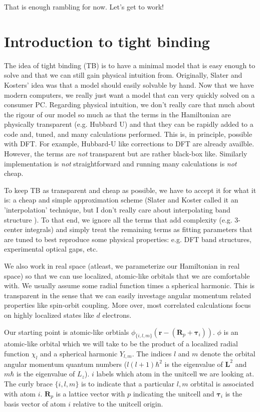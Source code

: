\documentclass[prb,aps,11pt,superscriptaddress,floatfix]{revtex4-2}
\begin{document}
That is enough rambling for now. Let's get to work!


\section{Introduction to tight binding}

The idea of tight binding (TB) is to have a minimal model that is easy enough to solve and that we can still gain physical intuition from. Originally, Slater and Kosters' idea was that a model should easily solvable by hand. Now that we have modern computers, we really just want a model that can very quickly solved on a consumer PC. Regarding physical intuition, we don't really care that much about the rigour of our model so much as that the terms in the Hamiltonian are physically transparent (e.g. Hubbard U) and that they can be rapidly added to a code and, tuned, and many calculations performed. This is, in principle, possible with DFT. For example, Hubbard-U like corrections to DFT are already availble. However, the terms are \emph{not} transparent but are rather black-box like. Similarly implementation is \emph{not} straightforward and running many calculations is \emph{not} cheap. 

To keep TB as transparent and cheap as possible, we have to accept it for what it is: a cheap and simple approximation scheme (Slater and Koster called it an 'interpolation' technique, but I don't really care about interpolating band structure ). To that end, we ignore all the terms that add complexity (e.g. 3-center integrals) and simply treat the remaining terms as fitting parameters that are tuned to best reproduce some physical properties: e.g. DFT band structures, experimental optical gaps, etc. 

We also work in real space (atleast, we parameterize our Hamiltonian in real space) so that we can use localized, atomic-like orbitals that we are comfortable with. We usually assume some radial function times a spherical harmonic. This is transparent in the sense that we can easily investage angular momentum related properties like spin-orbit coupling. More over, most correlated calculations focus on highly localized states like $d$ electrons. 

Our starting point is atomic-like orbtials $\phi_{\{i,l,m\}}(\pmb{r}-(\pmb{R}_p+\pmb{\tau}_i))$. $\phi$ is an atomic-like orbital which we will take to be the product of a localized radial function $\chi_l$ and a spherical harmonic $Y_{l,m}$. The indices $l$ and $m$ denote the orbital angular momentum quantum numbers ($l(l+1)\hbar^2$ is the eigenvalue of $\pmb{L}^2$ and $m\hbar$ is the eigenvalue of $L_z$). $i$ labels which atom in the unitcell we are looking at. The curly brace $\{i,l,m\}$ is to indicate that a particular $l,m$ orbtital is associated with atom $i$. $\pmb{R}_p$ is a lattice vector with $p$ indicating the unitcell and $\pmb{\tau}_i$ is the basis vector of atom $i$ relative to the unitcell origin.
\end{document}
